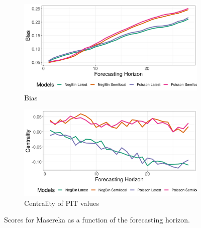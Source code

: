 \begin{figure}[H]
\begin{subfigure}{0.5\textwidth}
  \centering
  \includegraphics[width=\linewidth]{../output/Masereka_bias.png}  
  \caption{Bias}
  \label{fig:Masereka_scores_3}
\end{subfigure}
\begin{subfigure}{0.5\textwidth}
  \centering
  \includegraphics[width=\linewidth]{../output/Masereka_centrality.png}  
  \caption{Centrality of PIT values}
  \label{fig:Masereka_scores_4}
\end{subfigure}
  \caption{Scores for Masereka as a function of the forecasting horizon.}

  \label{fig:nat_scores}
\end{figure}
